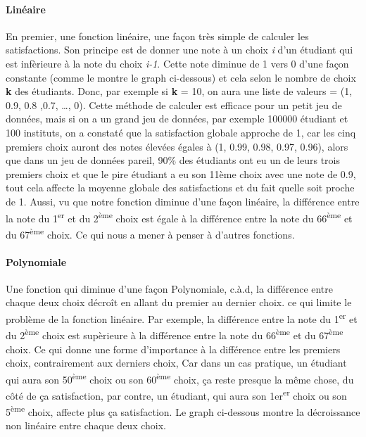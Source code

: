 \documentclass[12pt,titlepage]{article}
\begin{document}
\paragraph{Linéaire} En premier, une fonction linéaire, une façon très simple de calculer les satisfactions. Son principe est de donner une note à un choix \textit{i} d'un étudiant qui est infèrieure à la note du choix \textit{i-1}. Cette note diminue de 1 vers 0 d'une façon constante (comme le montre le graph ci-dessous) et cela selon le nombre de choix \textbf{k} des étudiants. Donc, par exemple si \textbf{k} = 10, on aura une liste de valeurs = (1, 0.9, 0.8 ,0.7, \dots, 0). 
Cette méthode de calculer est efficace pour un petit jeu de données, mais si on a un grand jeu de données, par exemple 100000 étudiant et 100 instituts, on a constaté que la satisfaction globale approche de 1, car les cinq premiers choix auront des notes élevées égales à (1, 0.99, 0.98, 0.97, 0.96), alors que dans un jeu de données pareil, 90\% des étudiants ont eu un de leurs trois premiers choix et que le pire étudiant a eu son 11ème choix avec une note de 0.9, tout cela affecte la moyenne globale des satisfactions et du fait quelle soit proche de 1. Aussi, vu que notre fonction diminue d'une façon linéaire, la différence entre la note du 1\textsuperscript{er} et du 2\textsuperscript{ème} choix est égale à la différence entre la note du 66\textsuperscript{ème} et du 67\textsuperscript{ème} choix. Ce qui nous a mener à penser à d'autres fonctions.

\begin{figure}
  
\end{figure}

\paragraph{Polynomiale} Une fonction qui diminue d'une façon Polynomiale, c.à.d, la différence entre  chaque deux choix décroît en allant du premier au dernier choix. ce qui limite le problème de la fonction linéaire. Par exemple, la différence entre la note du 1\textsuperscript{er} et du 2\textsuperscript{ème} choix est supèrieure à la différence entre la note du 66\textsuperscript{ème} et du 67\textsuperscript{ème} choix. Ce qui donne une forme d'importance à la différence entre les premiers choix, contrairement aux derniers choix, Car dans un cas pratique, un étudiant qui aura son 50\textsuperscript{ème} choix ou son 60\textsuperscript{ème} choix, ça reste presque la même chose, du côté de ça satisfaction, par contre, un étudiant, qui aura son 1er\textsuperscript{er} choix ou son 5\textsuperscript{ème} choix, affecte plus ça satisfaction. Le graph ci-dessous montre la décroissance non linéaire entre chaque deux choix. 
\end{document}
